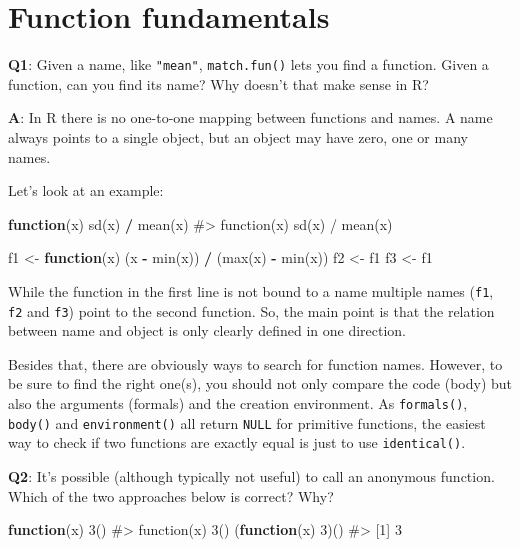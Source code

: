 \documentclass[
]{krantz}
\makeatletter
\newenvironment{Shaded}{\begin{snugshade}}{\end{snugshade}}
\newcommand{\CommentTok}[1]{\textcolor[rgb]{0.56,0.35,0.01}{\textit{#1}}}
\newcommand{\ControlFlowTok}[1]{\textcolor[rgb]{0.13,0.29,0.53}{\textbf{#1}}}
\newcommand{\DecValTok}[1]{\textcolor[rgb]{0.00,0.00,0.81}{#1}}
\newcommand{\KeywordTok}[1]{\textcolor[rgb]{0.13,0.29,0.53}{\textbf{#1}}}
\newcommand{\NormalTok}[1]{#1}
\newcommand{\OperatorTok}[1]{\textcolor[rgb]{0.81,0.36,0.00}{\textbf{#1}}}
\newcommand{\StringTok}[1]{\textcolor[rgb]{0.31,0.60,0.02}{#1}}
\newenvironment{kframe}{%
\medskip{}
\setlength{\fboxsep}{.8em}
 \def\at@end@of@kframe{}%
 \ifinner\ifhmode%
  \def\at@end@of@kframe{\end{minipage}}%
  \begin{minipage}{\columnwidth}%
 \fi\fi%
 \def\FrameCommand##1{\hskip\@totalleftmargin \hskip-\fboxsep
 \colorbox{shadecolor}{##1}\hskip-\fboxsep
     \hskip-\linewidth \hskip-\@totalleftmargin \hskip\columnwidth}%
 \MakeFramed {\advance\hsize-\width
   \@totalleftmargin\z@ \linewidth\hsize
   \@setminipage}}%
 {\par\unskip\endMakeFramed%
 \at@end@of@kframe}
\renewenvironment{Shaded}{\begin{kframe}}{\end{kframe}}
\renewcommand{\KeywordTok} [1]{\textcolor[rgb]{0.00,0.44,0.13}{{#1}}}
\renewcommand{\DecValTok}  [1]{\textcolor[rgb]{0.25,0.63,0.44}{{#1}}}
\renewcommand{\StringTok}  [1]{\textcolor[rgb]{0.25,0.44,0.63}{{#1}}}
\renewcommand{\CommentTok} [1]{\textcolor[rgb]{0.38,0.63,0.69}{{#1}}}
\renewcommand{\NormalTok}  [1]{{#1}}
\makeatother
\begin{document}
\hypertarget{function-fundamentals}{%
\section{Function fundamentals}\label{function-fundamentals}}

\textbf{{Q1}}: Given a name, like \texttt{"mean"}, \texttt{match.fun()} lets you find a function. Given a function, can you find its name? Why doesn't that make sense in R?

\textbf{{A}}: In R there is no one-to-one mapping between functions and names. A name always points to a single object, but an object may have zero, one or many names.

Let's look at an example:

\begin{Shaded}
\begin{Highlighting}[]
\ControlFlowTok{function}\NormalTok{(x) }\KeywordTok{sd}\NormalTok{(x) }\OperatorTok{/}\StringTok{ }\KeywordTok{mean}\NormalTok{(x)}
\CommentTok{#> function(x) sd(x) / mean(x)}

\NormalTok{f1 <-}\StringTok{ }\ControlFlowTok{function}\NormalTok{(x) (x }\OperatorTok{-}\StringTok{ }\KeywordTok{min}\NormalTok{(x)) }\OperatorTok{/}\StringTok{ }\NormalTok{(}\KeywordTok{max}\NormalTok{(x) }\OperatorTok{-}\StringTok{ }\KeywordTok{min}\NormalTok{(x))}
\NormalTok{f2 <-}\StringTok{ }\NormalTok{f1}
\NormalTok{f3 <-}\StringTok{ }\NormalTok{f1}
\end{Highlighting}
\end{Shaded}

While the function in the first line is not bound to a name multiple names (\texttt{f1}, \texttt{f2} and \texttt{f3}) point to the second function. So, the main point is that the relation between name and object is only clearly defined in one direction.

Besides that, there are obviously ways to search for function names. However, to be sure to find the right one(s), you should not only compare the code (body) but also the arguments (formals) and the creation environment. As \texttt{formals()}, \texttt{body()} and \texttt{environment()} all return \texttt{NULL} for primitive functions, the easiest way to check if two functions are exactly equal is just to use \texttt{identical()}.

\textbf{{Q2}}: It's possible (although typically not useful) to call an anonymous function. Which of the two approaches below is correct? Why?

\begin{Shaded}
\begin{Highlighting}[]
\ControlFlowTok{function}\NormalTok{(x) }\DecValTok{3}\NormalTok{()}
\CommentTok{#> function(x) 3()}
\NormalTok{(}\ControlFlowTok{function}\NormalTok{(x) }\DecValTok{3}\NormalTok{)()}
\CommentTok{#> [1] 3}
\end{Highlighting}
\end{Shaded}
\end{document}
